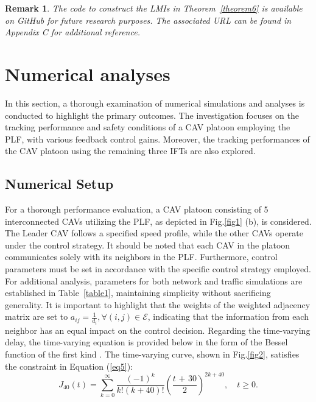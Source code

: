 \documentclass[journal]{IEEEtran}
\newtheorem{remark}[theorem]{Remark}
\begin{document}
\begin{remark}
  \label{remark7}
  The code to construct the LMIs in Theorem~\ref{theorem6} is available on GitHub for future research purposes. The associated URL can be found in Appendix C for additional reference.
\end{remark}

\section{Numerical analyses}
\label{Section 5}
In this section, a thorough examination of numerical simulations and analyses is conducted to highlight the primary outcomes. The investigation focuses on the tracking performance and safety conditions of a CAV platoon employing the PLF, with various feedback control gains. Moreover, the tracking performances of the CAV platoon using the remaining three IFTs are also explored.

\subsection{Numerical Setup}
\label{Section 5.1}
For a thorough performance evaluation, a CAV platoon consisting of 5 interconnected CAVs utilizing the PLF, as depicted in Fig.\ref{fig1} (b), is considered. The Leader CAV follows a specified speed profile, while the other CAVs operate under the control strategy. It should be noted that each CAV in the platoon communicates solely with its neighbors in the PLF. Furthermore, control parameters must be set in accordance with the specific control strategy employed. For additional analysis, parameters for both network and traffic simulations are established in Table~\ref{table1}, maintaining simplicity without sacrificing generality. It is important to highlight that the weights of the weighted adjacency matrix are set to $ {a_{ij}} = \frac{1}{{{d_i}}},\forall (i,j) \in \mathcal{E} $, indicating that the information from each neighbor has an equal impact on the control decision. Regarding the time-varying delay, the time-varying equation is provided below in the form of the Bessel function of the first kind \citep{liang2017spectrum,soret2010capacity,vicario2006analytical}. The time-varying curve, shown in Fig.\ref{fig2}, satisfies the constraint in Equation (\ref{eq5}):
\begin{equation}
  \label{eq51}
  {J_{40}}(t) = \sum\limits_{k = 0}^\infty  {\frac{{{{( - 1)}^k}}}{{k!(k + 40)!}}} {\left( {\frac{{t{\text{ + }}30}}{2}} \right)^{2k + 40}},\quad t \geqslant 0.
\end{equation}
\end{document}
